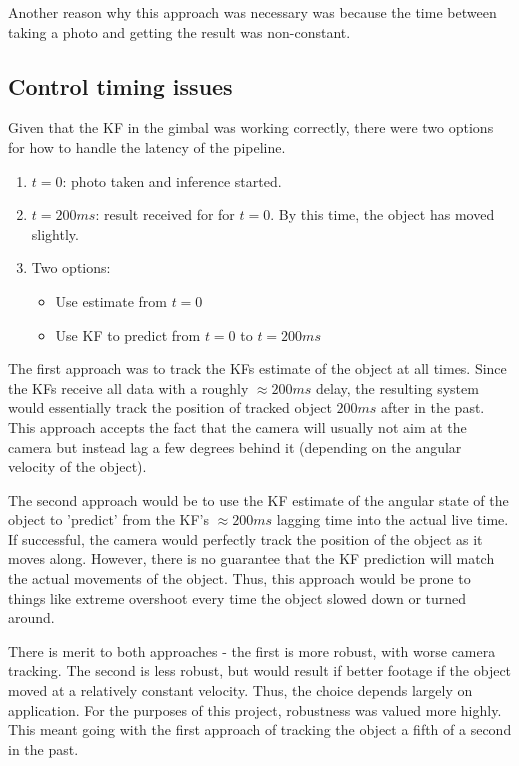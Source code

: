 Another reason why this approach was necessary was because the time between taking a photo and getting the result was non-constant.

\subsection{Control timing issues}
Given that the KF in the gimbal was working correctly, there were two options for how to handle the latency of the pipeline.

\begin{enumerate}
\item $t = 0$: photo taken and inference started.
\item $t = 200ms$: result received for for $t=0$. By this time, the object has moved slightly.
\item Two options:
	\begin{itemize}
	\item Use estimate from $t=0$
	\item Use KF to predict from $t=0$ to $t=200ms$
	\end{itemize}
\end{enumerate}

The first approach was to track the KFs estimate of the object at all times. Since the KFs receive all data with a roughly $\approx 200ms$ delay, the resulting system would essentially track the position of tracked object $200ms$ after in the past. This approach accepts the fact that the camera will usually not aim at the camera but instead lag a few degrees behind it (depending on the angular velocity of the object).

The second approach would be to use the KF estimate of the angular state of the object to 'predict' from the KF's $\approx 200ms$ lagging time into the actual live time. If successful, the camera would perfectly track the position of the object as it moves along. However, there is no guarantee that the KF prediction will match the actual movements of the object. Thus, this approach would be prone to things like extreme overshoot every time the object slowed down or turned around.

There is merit to both approaches - the first is more robust, with worse camera tracking. The second is less robust, but would result if better footage if the object moved at a relatively constant velocity. Thus, the choice depends largely on application. For the purposes of this project, robustness was valued more highly. This meant going with the first approach of tracking the object a fifth of a second in the past.


